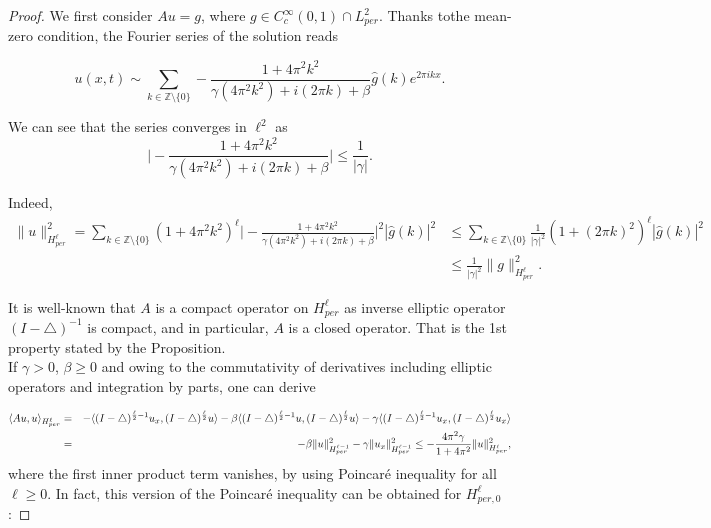 \documentclass[10pt,a4paper,final]{article}
\numberwithin{equation}{section}
\newcommand{\Z}{\mathbb{Z}}
\newcommand{\Gb}{\beta}
\newcommand{\Gg}{\gamma}
\begin{document}
\begin{proof}
We first consider $Au=g$, where $g\in C^{\infty}_c(0,1)\cap L^2_{per}$. Thanks tothe  mean-zero condition, the Fourier series of the solution reads

$$u(x, t)\sim \sum_{k\in \Z\setminus \{0\}} -\frac{1+4\pi^2k^2}{\Gg(4\pi^2k^2)+i(2\pi k)+\Gb}\widehat{g}(k)e^{2\pi ikx}.$$

We can see that the series converges in $\ell^2$ as 
$$\bigg|-\frac{1+4\pi^2k^2}{\Gg(4\pi^2k^2)+i(2\pi k)+\Gb}\bigg|\leq \frac{1}{|\Gg|}.$$

Indeed, 
\begin{align}\label{3-2}
   \|u\|_{H^{\ell}_{per}}^2=\sum_{k\in \Z\setminus \{0\}} (1+4\pi^2k^2)^{\ell}\bigg|-\frac{1+4\pi^2k^2}{\Gg(4\pi^2k^2)+i(2\pi k)+\Gb}\bigg|^2|\widehat{g}(k)|^2 &\leq      \sum_{k\in \Z\setminus \{0\}} \frac{1}{|\Gg|^2} (1+(2\pi k)^2)^{\ell }|\widehat{g}(k)|^2 \nonumber\\
   &\leq \frac{1}{|\Gg|^2}\|g\|_{H^{\ell}_{per}}^2.
\end{align}



It is well-known that $A$ is a compact operator on $H^{\ell}_{per}$ as inverse elliptic operator $(I-\triangle)^{-1}$ is compact, and in particular, $A$ is a closed operator. That is the 1st property stated by the Proposition.\\

If $\gamma> 0$, $\Gb\geq 0$ and owing to the commutativity of derivatives including elliptic operators and integration by parts, one can derive

\begin{eqnarray*}
    \langle Au,u\rangle_{H^\ell_{per}}&=& -\langle(I-\triangle)^{{\ell\over2}-1}u_x,(I-\triangle)^{{\ell\over2}}u\rangle-\beta\langle(I-\triangle)^{{\ell\over2}-1}u,(I-\triangle)^{{\ell\over2}}u\rangle-\gamma\langle(I-\triangle)^{{\ell\over2}-1}u_x,(I-\triangle)^{{\ell\over2}}u_x\rangle \\
    &=&-\beta\|u\|_{H^{\ell-1}_{per}}^2-\gamma\|u_x\|_{H^{\ell-1}_{per}}^2\leq-\frac{4\pi^2\gamma}{1+4\pi^2}\|u\|_{H^{\ell}_{per}}^2, 
\end{eqnarray*} where the first inner product term vanishes, by using Poincar\'e inequality for all $\ell\ge 0$. In fact, this version of the Poincaré inequality can be obtained for $H^{\ell}_{per, 0}$:


\end{proof}
\end{document}
